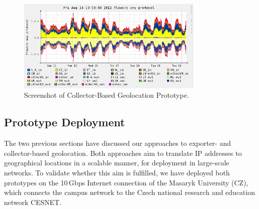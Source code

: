 \begin{figure}[!tb]
    \centering
    \includegraphics[width=0.8\textwidth]{figures/paper-geolocation/nfgeodump.png}
    \caption{Screenshot of Collector-Based Geolocation Prototype.}
    \label{fig:geo-nfgeodump_screenshot}
\end{figure}

\subsection{Prototype Deployment} \label{subsec:geo-prototype_deployment}

The two previous sections have discussed our approaches to exporter- and collector-based geolocation. Both approaches aim to translate IP addresses to geographical locations in a scalable manner, for deployment in large-scale networks. To validate whether this aim is fulfilled, we have deployed both prototypes on the 10\,Gbps Internet connection of the Masaryk University (CZ), which connects the campus network to the Czech national research and education network CESNET.

